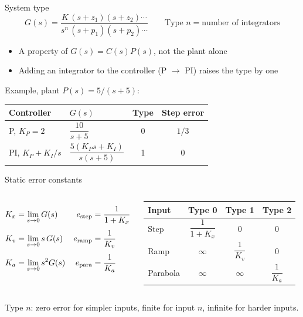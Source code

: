 \documentclass[aspectratio=169,11pt]{beamer}
\begin{document}
\begin{frame}{System type}
  \[
    G(s) = \frac{K\,(s + z_1)(s + z_2)\cdots}{s^n\,(s + p_1)(s + p_2)\cdots}
    \qquad \text{Type } n = \text{number of integrators}
  \]

  \begin{itemize}
    \item A property of $G(s) = C(s)P(s)$, not the plant alone
    \item Adding an integrator to the controller (P $\to$ PI) raises the type by one
  \end{itemize}

  \medskip
  Example, plant $P(s) = 5/(s+5)$:
  \begin{center}
  \begin{tabular}{llcc}
    \toprule
    Controller & $G(s)$ & Type & Step error \\
    \midrule
    P, $K_P = 2$      & $\dfrac{10}{s+5}$                 & 0 & $1/3$ \\[8pt]
    PI, $K_P + K_I/s$ & $\dfrac{5(K_P s + K_I)}{s(s+5)}$ & 1 & $0$ \\[4pt]
    \bottomrule
  \end{tabular}
  \end{center}
\end{frame}

\begin{frame}{Static error constants}
  \begin{columns}[T]
    \begin{align*}
      K_x &= \lim_{s\to 0} G(s)      & e_{\rm step} &= \frac{1}{1+K_x} \\[4pt]
      K_v &= \lim_{s\to 0} s\,G(s)   & e_{\rm ramp} &= \frac{1}{K_v} \\[4pt]
      K_a &= \lim_{s\to 0} s^2 G(s)  & e_{\rm para} &= \frac{1}{K_a}
    \end{align*}

    \centering
    \begin{tabular}{lccc}
      \toprule
      Input    & Type 0          & Type 1          & Type 2 \\
      \midrule
      Step     & $\dfrac{1}{1+K_x}$ & $0$             & $0$ \\[8pt]
      Ramp     & $\infty$            & $\dfrac{1}{K_v}$ & $0$ \\[8pt]
      Parabola & $\infty$            & $\infty$         & $\dfrac{1}{K_a}$ \\[4pt]
      \bottomrule
    \end{tabular}
  \end{columns}

  \bigskip
  Type $n$: zero error for simpler inputs, finite for input $n$, infinite for harder inputs.
\end{frame}
\end{document}
